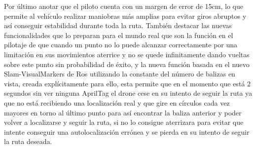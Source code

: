 \hspace{1cm} Por último anotar que el piloto cuenta con un margen de error de 15cm, lo que permite al vehículo realizar maniobras más amplias para evitar giros abruptos y así conseguir estabilidad durante toda la ruta. También destacar las nuevas funcionalidades que lo preparan para el mundo real que son la función en el pilotaje de que cuando un punto no lo puede alcanzar correctamente por una limitación en sus movimientos aterrice y no se quede infinitamente dando vueltas sobre este punto sin probabilidad de éxito, y la nueva función basada en el nuevo Slam-VisualMarkers de Ros utilizando la constante del número de balizas en vista, creada explícitamente para ello, esta permite que en el momento que está 2 segundos sin ver ninguna AprilTag el drone cese en su intento de seguir la ruta ya que no está recibiendo una localización real y que gire en círculos cada vez mayores en torno al último punto para así encontrar la baliza anterior y poder volver a localizarse y seguir la ruta, si no lo consigue aterrizara para evitar que intente conseguir una autolocalización errónea y se pierda en su intento de seguir la ruta deseada.